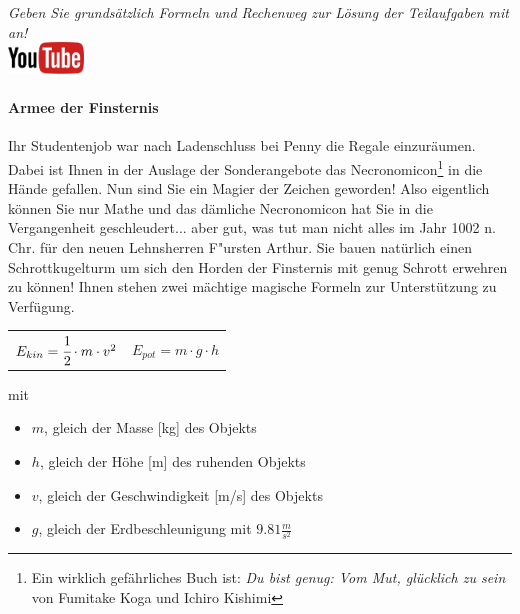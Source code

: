 \documentclass[a4paper, 9pt]{scrartcl}\usepackage[]{graphicx}\usepackage[]{xcolor}
\begin{document}
\textit{Geben Sie grunds{\"a}tzlich Formeln und Rechenweg zur L{\"o}sung der
  Teilaufgaben mit an!} \\[1Ex]

\hfill\href{https://youtu.be/Bbu6n8MXxQk}{\includegraphics[width =
  2cm]{img/youtube}} %
\hspace{2Ex}

\paragraph{Armee der Finsternis}



Ihr Studentenjob war nach Ladenschluss bei Penny die Regale
einzur{\"a}umen. Dabei ist Ihnen in der Auslage der Sonderangebote das
Necronomicon\footnote{Ein wirklich gef{\"a}hrliches Buch ist:
  \textit{Du bist genug: Vom Mut, gl{\"u}cklich zu sein} von Fumitake Koga und
  Ichiro Kishimi} in die H{\"a}nde gefallen. Nun sind Sie ein Magier der
Zeichen geworden! Also eigentlich k{\"o}nnen Sie nur Mathe und das d{\"a}mliche
Necronomicon hat Sie in die Vergangenheit geschleudert... aber gut, was tut
man nicht alles im Jahr 1002 n. Chr. f{\"u}r den neuen Lehnsherren
F{"u}rsten Arthur. Sie bauen nat{\"u}rlich einen Schrottkugelturm um sich den
Horden der Finsternis mit genug Schrott erwehren zu k{\"o}nnen! Ihnen stehen
zwei m{\"a}chtige magische Formeln zur Unterst{\"u}tzung zu Verf{\"u}gung.

\begin{center}
  \begin{tabular}{cc}
    $E_{kin} = \cfrac{1}{2}\cdot m \cdot v^2$ & $E_{pot} = m \cdot g \cdot h$\\
  \end{tabular}
\end{center}

mit

\begin{itemize}
\item $m$, gleich der Masse [kg] des Objekts
\item $h$, gleich der H{\"o}he [m] des ruhenden Objekts
\item $v$, gleich der Geschwindigkeit [m/s] des Objekts
\item $g$, gleich der Erdbeschleunigung mit $9.81 \tfrac{m}{s^2}$ 
\end{itemize}
\end{document}
